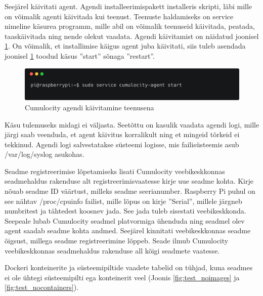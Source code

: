 \documentclass[12pt]{article}
\begin{document}
  \FloatBarrier
 
 
  Seejärel käivitati agent. Agendi installeerimispakett installeris skripti, läbi mille
  on võimalik agenti käivitada kui teenust. Teenuste haldamiseks on service nimeline käsurea
  programm, mille abil on võimalik teenuseid käivitada, peatada, taaskäivitada ning nende
  olekut vaadata. Agendi käivitamist on näidatud joonisel \ref{fig:agent_service_start}.
  On võimalik, et installimise käigus agent juba käivitati, siis tuleb asendada joonisel
  \ref{fig:agent_service_start} toodud käsus ''start'' sõnaga ''restart''.
 
  \begin{figure} [ht] %
  \begin{center}
  \includegraphics[width=1.0\textwidth]{agent_service_start}
  \caption{Cumulocity agendi käivitamine teenusena}
  \label{fig:agent_service_start}
  \end{center}
  \end{figure}
 
  \FloatBarrier
 
  Käsu tulemuseks midagi ei väljasta. Seetõttu on kasulik vaadata agendi logi, mille järgi
  saab veenduda, et agent käivitus korralikult ning et mingeid tõrkeid ei tekkinud. Agendi
  logi salvestatakse süsteemi logisse, mis failisüsteemis asub /var/log/syslog asukohas.
  
  Seadme registreerimise lõpetamiseks lisati Cumulocity veebikeskkonnas seadmehaldus
  rakenduse alt registreerimisvaatesse kirje uue seadme kohta. Kirje nõuab seadme ID väärtust,
  milleks seadme seerianumber. Raspberry Pi puhul on see nähtav /proc/cpuinfo failist, mille
  lõpus on kirje ''Serial'', millele järgneb numbritest ja tähtedest koosnev jada. See jada
  tuleb sisestati veebikeskkonda. Seepeale lubab Cumulocity seadmel platvormiga ühenduda ning
  seadmel olev agent saadab seadme kohta andmed. Seejärel kinnitati veebikeskkonnas
  seadme õigsust, millega seadme registreerimine lõppeb. Seade ilmub Cumulocity veebikeskkonnas
  seadmehaldus rakenduse all kõigi seadmete vaatesse.
 
  Dockeri konteinerite ja süsteemipiltide vaadete tabelid on tühjad, kuna seadmes ei ole
  ühtegi süsteemipilti ega konteinerit veel (Joonis \ref{fig:test_noimages} ja
  \ref{fig:test_nocontainers}).
 
\end{document}
